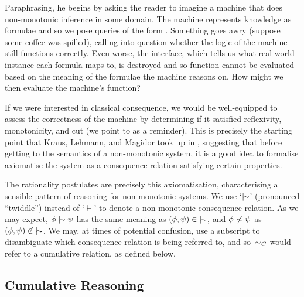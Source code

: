 Paraphrasing, he begins by asking the reader to imagine a machine that does non-monotonic inference in some domain. The machine
represents knowledge as formulae and so we pose queries of the form .
Something goes awry (suppose some coffee was spilled), calling into question whether the logic of the machine still
functions correctly. Even worse, the interface, which tells us what real-world instance each formula maps to, is
destroyed and so function cannot be evaluated based on the meaning of the formulae the machine reasons on. How might we then
evaluate the machine's function?

If we were interested in classical consequence, we would be well-equipped to assess the correctness of the machine by
determining if it satisfied reflexivity, monotonicity, and cut (we point to  as a
reminder). This is precisely the starting point that Kraus, Lehmann, and Magidor took up in \cite{kraus1990nonmonotonic},
suggesting that before getting to the semantics of a non-monotonic system, it is a good idea to formalise axiomatise the
system as a consequence relation satisfying certain properties.

The rationality postulates are precisely this axiomatisation, characterising a sensible pattern of reasoning for non-monotonic
systems. We use `$\twiddle$' (pronounced ``twiddle'') instead of `$\vdash$' to denote a non-monotonic consequence relation.
As we may expect, $\phi \twiddle \psi$ has the same meaning as $(\phi, \psi) \in \; \twiddle$, and $\phi \ntwiddle \psi$
as $(\phi, \psi)\not \in \; \twiddle$. We may, at times of potential confusion, use a subscript to disambiguate which consequence
relation is being referred to, and so $\twiddle_{C}$ would refer to a cumulative relation, as defined below.


\subsection{Cumulative Reasoning}
\label{subsection:system-c} 

